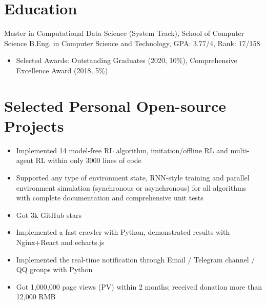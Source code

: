 \documentclass{resume}
\begin{document}



\section{Education}
Master in Computational Data Science (System Track), School of Computer Science
B.Eng. in Computer Science and Technology, GPA: 3.77/4, Rank: 17/158
\begin{itemize}
    \item Selected Awards: Outstanding Graduates (2020, 10\%), Comprehensive Excellence Award (2018, 5\%)
\end{itemize}

\section{Selected Personal Open-source Projects}
\begin{itemize}
  \item Implemented 14 model-free RL algorithm, imitation/offline RL and multi-agent RL within only 3000 lines of code
  \item Supported any type of environment state, RNN-style training and parallel environment simulation (synchronous or asynchronous) for all algorithms with complete documentation and comprehensive unit tests
  \item Got 3k GitHub stars
\end{itemize}

\begin{itemize}
  \item Implemented a fast crawler with Python, demonstrated results with Nginx+React and echarts.js
  \item Implemented the real-time notification through Email / Telegram channel / QQ groups with Python
  \item Got 1,000,000 page views (PV) within 2 months; received donation more than 12,000 RMB
\end{itemize}
\end{document}
